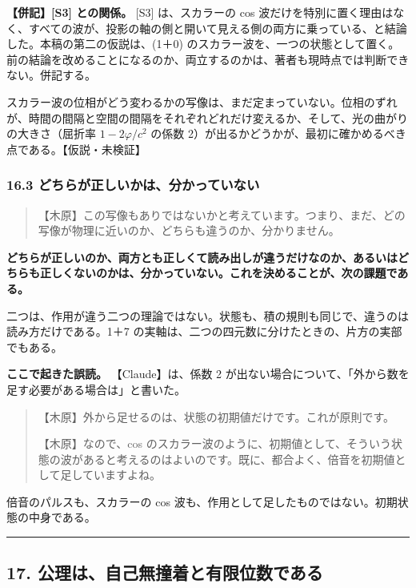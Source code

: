\documentclass[
  a4paper,
]{ltjsarticle}
\begin{document}
\textbf{【併記】{[}S3{]} との関係。} {[}S3{]} は、スカラーの cos
波だけを特別に置く理由はなく、すべての波が、投影の軸の側と開いて見える側の両方に乗っている、と結論した。本稿の第二の仮説は、(1＋0)
のスカラー波を、一つの状態として置く。前の結論を改めることになるのか、両立するのかは、著者も現時点では判断できない。併記する。

スカラー波の位相がどう変わるかの写像は、まだ定まっていない。位相のずれが、時間の間隔と空間の間隔をそれぞれどれだけ変えるか、そして、光の曲がりの大きさ（屈折率
\(1 - 2\varphi/c^2\) の係数
2）が出るかどうかが、最初に確かめるべき点である。【仮説・未検証】

\subsubsection{16.3
どちらが正しいかは、分かっていない}\label{ux3069ux3061ux3089ux304cux6b63ux3057ux3044ux304bux306fux5206ux304bux3063ux3066ux3044ux306aux3044}

\begin{quote}
【木原】この写像もありではないかと考えています。つまり、まだ、どの写像が物理に近いのか、どちらも違うのか、分かりません。
\end{quote}

\textbf{どちらが正しいのか、両方とも正しくて読み出しが違うだけなのか、あるいはどちらも正しくないのかは、分かっていない。これを決めることが、次の課題である。}

二つは、作用が違う二つの理論ではない。状態も、積の規則も同じで、違うのは読み方だけである。1＋7
の実軸は、二つの四元数に分けたときの、片方の実部でもある。

\textbf{ここで起きた誤読。} 【Claude】は、係数 2
が出ない場合について、「外から数を足す必要がある場合は」と書いた。

\begin{quote}
【木原】外から足せるのは、状態の初期値だけです。これが原則です。

【木原】なので、cos
のスカラー波のように、初期値として、そういう状態の波があると考えるのはよいのです。既に、都合よく、倍音を初期値として足していますよね。
\end{quote}

倍音のパルスも、スカラーの cos
波も、作用として足したものではない。初期状態の中身である。

\begin{center}\rule{0.5\linewidth}{0.5pt}\end{center}

\subsection{17.
公理は、自己無撞着と有限位数である}\label{ux516cux7406ux306fux81eaux5df1ux7121ux649eux7740ux3068ux6709ux9650ux4f4dux6570ux3067ux3042ux308b}
\end{document}
